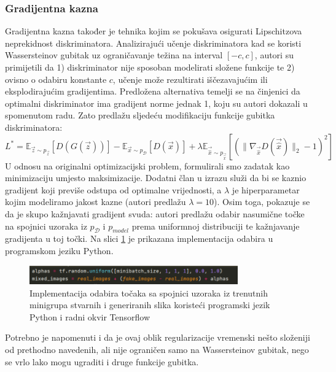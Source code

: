 \subsubsection{Gradijentna kazna}
Gradijentna kazna  \citep{gulrajani2017improved} također je tehnika kojim se pokušava osigurati Lipschitzova neprekidnost diskriminatora. Analizirajući učenje diskriminatora kad se koristi Wassersteinov gubitak uz ograničavanje težina na interval $[-c, c]$, autori su primijetili da 1) diskriminator nije sposoban modelirati složene funkcije te 2) ovisno o odabiru konstante $c$, učenje može rezultirati iščezavajućim ili eksplodirajućim gradijentima. Predložena alternativa temelji se na činjenici da optimalni diskriminator ima gradijent norme jednak 1, koju su autori dokazali u spomenutom radu. Zato predlažu sljedeću modifikaciju funkcije gubitka diskriminatora:
\begin{equation}
L^* = \mathbb{E}_{\vec{z} \sim p_{\vec{z}}}\left[D(G(\vec{z}))\right] - \mathbb{E}_{\vec{x} \sim p_{\mathcal{D}}} \left[D(\vec{x})\right] + \lambda \mathbb{E}_{\vec{\hat{x}} \sim p_{\vec{\hat{x}}}} \left[\left(\|\nabla_{\vec{\hat{x}}} D(\vec{\hat{x}})\|_2 - 1 \right) ^2 \right] 
\end{equation}
U odnosu na originalni optimizacijski problem, formulirali smo zadatak kao minimizaciju umjesto maksimizacije. Dodatni član u izrazu služi da bi se kaznio gradijent koji previše odstupa od optimalne vrijednosti, a $\lambda$ je hiperparametar kojim modeliramo jakost kazne (autori predlažu $\lambda = 10$). Osim toga, pokazuje se da je skupo kažnjavati gradijent svuda: autori predlažu odabir nasumične točke na spojnici uzoraka iz $p_{\mathcal{D}}$ i $p_{model}$ prema uniformnoj distribuciji te kažnjavanje gradijenta u toj točki. Na slici \ref{gp_calc} je prikazana implementacija odabira u programskom jeziku Python.

\begin{figure}[h]
\centering
		\includegraphics[width=0.8\textwidth]{images/gp_calc.png}
\caption{Implementacija odabira točaka sa spojnici uzoraka iz trenutnih minigrupa stvarnih i generiranih slika koristeći programski jezik Python i radni okvir Tensorflow}
\label{gp_calc}
\end{figure} 

Potrebno je napomenuti i da je ovaj oblik regularizacije vremenski nešto složeniji od prethodno navedenih, ali nije ograničen samo na Wassersteinov gubitak, nego se vrlo lako mogu ugraditi i druge funkcije gubitka.

